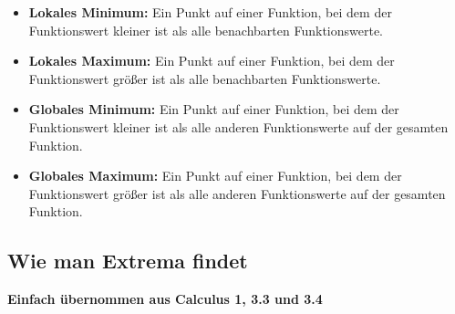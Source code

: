 \documentclass{report}
\begin{document}
\begin{itemize}
\item \textbf{Lokales Minimum:} Ein Punkt auf einer Funktion, bei dem der Funktionswert kleiner ist als alle benachbarten Funktionswerte.
\item \textbf{Lokales Maximum:} Ein Punkt auf einer Funktion, bei dem der Funktionswert größer ist als alle benachbarten Funktionswerte.
\item \textbf{Globales Minimum:} Ein Punkt auf einer Funktion, bei dem der Funktionswert kleiner ist als alle anderen Funktionswerte auf der gesamten Funktion.
\item \textbf{Globales Maximum:} Ein Punkt auf einer Funktion, bei dem der Funktionswert größer ist als alle anderen Funktionswerte auf der gesamten Funktion.
\end{itemize}

\subsection{Wie man Extrema findet}
\textbf{Einfach übernommen aus Calculus 1, 3.3 und 3.4}
\end{document}
